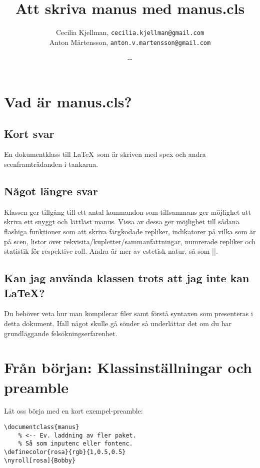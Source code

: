 \documentclass[a4paper,12pt]{article}
\newcommand*{\pack}{\textsf}
\renewcommand{\dateseparator}{-}
\newcommand{\todayiso}{%
	\the\year\dateseparator\twodigit\month\dateseparator\twodigit\day}
\begin{document}
\title{Att skriva manus med \pack{manus.cls}}
\author{%
	Cecilia Kjellman, \texttt{cecilia.kjellman@gmail.com}\\%
	Anton Mårtensson, \texttt{anton.v.martensson@gmail.com}}
\date{\todayiso}
\maketitle



\tableofcontents
\newpage



\section{Vad är \pack{manus.cls}?}

\subsection{Kort svar}
En dokumentklass till \LaTeX\ som är skriven med spex och andra scenframträdanden i tankarna.

\subsection{Något längre svar}
Klassen ger tillgång till ett antal kommandon som tillsammans ger möjlighet att skriva ett snyggt och lättläst manus. Vissa av dessa ger möjlighet till sådana flashiga funktioner som att skriva färgkodade repliker, indikatorer på vilka som är på scen, listor över rekvisita/kupletter/sammanfattningar, numrerade repliker och statistik för respektive roll. Andra är mer av estetisk natur, så som |\akt|. 

\subsection{Kan jag använda klassen trots att jag inte kan \LaTeX?}
Du behöver veta hur man kompilerar filer samt förstå syntaxen som presenteras i detta dokument. Ifall något skulle gå sönder så underlättar det om du har grundläggande felsökningserfarenhet.



\section{Från början: Klassinställningar och preamble}
Låt oss börja med en kort exempel-preamble:

\begin{lstlisting}
\documentclass{manus}
	% <-- Ev. laddning av fler paket.
	% Så som inputenc eller fontenc.
\definecolor{rosa}{rgb}{1,0.5,0.5}
\nyroll[rosa]{Bobby}
\end{lstlisting}
\end{document}
